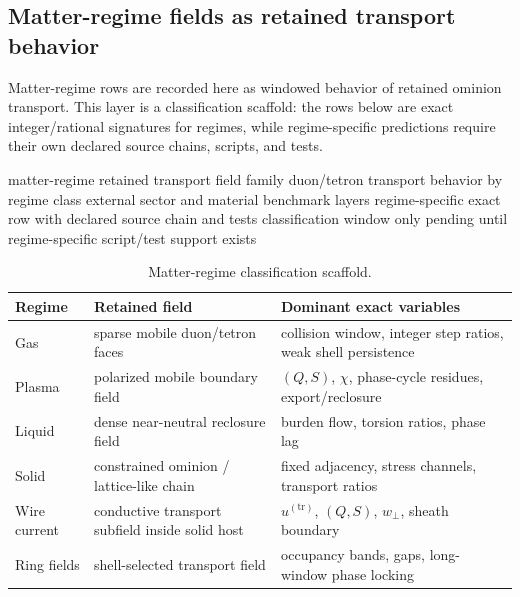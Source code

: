 \subsection{Matter-regime fields as retained transport behavior}
\label{man:matter-regime-fields}

Matter-regime rows are recorded here as windowed behavior of retained ominion transport. This layer is a classification scaffold: the rows below are exact integer/rational signatures for regimes, while regime-specific predictions require their own declared source chains, scripts, and tests.

\RetentionBlock
{matter-regime retained transport field family}
{duon/tetron transport behavior by regime class}
{external sector and material benchmark layers}
{regime-specific exact row with declared source chain and tests}
{classification window only}
{pending until regime-specific script/test support exists}

\begin{table}[H]
\centering
\caption{Matter-regime classification scaffold.}
\label{tab:matter-regime-scaffold}
\begin{threeparttable}
\small
\begin{tabularx}{\linewidth}{@{}lXX@{}}
\toprule
Regime & Retained field & Dominant exact variables \\
\midrule
Gas & sparse mobile duon/tetron faces & collision window, integer step ratios, weak shell persistence \\
Plasma & polarized mobile boundary field & \((Q,S)\), \(\chi\), phase-cycle residues, export/reclosure \\
Liquid & dense near-neutral reclosure field & burden flow, torsion ratios, phase lag \\
Solid & constrained ominion / lattice-like chain & fixed adjacency, stress channels, transport ratios \\
Wire current & conductive transport subfield inside solid host & \(u^{(\mathrm{tr})}\), \((Q,S)\), \(w_\perp\), sheath boundary \\
Ring fields & shell-selected transport field & occupancy bands, gaps, long-window phase locking \\
\bottomrule
\end{tabularx}
\end{threeparttable}
\end{table}

